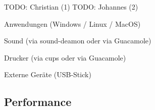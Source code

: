 \documentclass[runningheads]{llncs}
\begin{document}
TODO: Christian (1)
TODO: Johannes (2)

Anwendungen (Windows / Linux / MacOS)

Sound (via sound-deamon oder via Guacamole)

Drucker (via cups oder via Guacamole)

Externe Geräte (USB-Stick)


\subsection{Performance}
%
%
\end{document}
